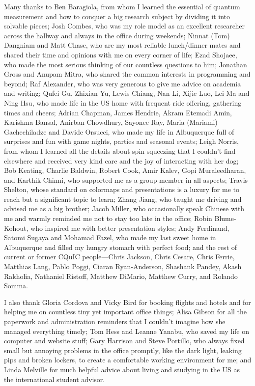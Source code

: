 \begin{acknowledgments}
Many thanks to Ben Baragiola, from whom I learned the essential of quantum measurement and how to conquer a big research subject by dividing it into solvable pieces; Josh Combes, who was my role model as an excellent researcher across the hallway and always in the office during weekends; 
Ninnat (Tom) Dangniam and Matt Chase, who are my most reliable lunch/dinner mates and shared their time and opinions with me on every corner of life; Ezad Shojaee, who made the most serious thinking of our countless questions to him; Jonathan Gross and Anupam Mitra, who shared the common interests in programming and beyond; 
Raf Alexander, who was very generous to give me advice on academia and writing; Qufei Gu, Zhixian Yu, Lewis Chiang, Nan Li, Xijie Luo, Lei Ma and Ning Hsu, who made life in the US home with frequent ride offering, gathering times and cheers; 
Adrian Chapman, James Hendrie, Akram Etemadi Amin, Karishma Bansal, Anirban Chowdhury, Sayonee Ray, Maria (Mariami) Gachechiladze and Davide Orsucci, who made my life in Albuquerque full of surprises and fun with game nights, parties and seasonal events; 
Leigh Norris, from whom I learned all the details about spin squeezing that I couldn't find elsewhere and received very kind care and the joy of interacting with her dog; Bob Keating, Charlie Baldwin, Robert Cook, Amir Kalev, Gopi Muraleedharan, and Karthik Chinni, who supported me as a group member in all aspects; 
Travis Shelton, whose standard on colormaps and presentations is a luxury for me to reach but a significant topic to learn; 
Zhang Jiang, who taught me driving and advised me as a big brother; Jacob Miller, who occasionally speak Chinese with me and warmly reminded me not to stay too late in the office; 
Robin Blume-Kohout, who inspired me with better presentation styles; Andy Ferdinand, Satomi Sugaya and Mohamad Fazel, who made my last sweet home in Albuquerque and filled my hungry stomach with perfect food; 
and the rest of current or former CQuIC people---Chris Jackson, Chris Cesare, Chris Ferrie, Matthias Lang, Pablo Poggi, Ciaran Ryan-Anderson, Shashank Pandey, Akash Rakholia, Nathaniel Ristoff, Matthew DiMario, Matthew Curry, and Rolando Somma.

I also thank Gloria Cordova and Vicky Bird for booking flights and hotels and for helping me on countless tiny yet important office things; 
Alisa Gibson for all the paperwork and administration reminders that I couldn't imagine how she managed everything timely; 
Tom Hess and Leanne Yanabu, who saved my life on computer and website stuff; Gary Harrison and Steve Portillo, who always fixed small but annoying problems in the office promptly, like the dark light, leaking pips and broken lockers, to create a comfortable working environment for me; and Linda Melville for much helpful advice about living and studying in the \hbox{US} as the international student advisor.


\end{acknowledgments}
